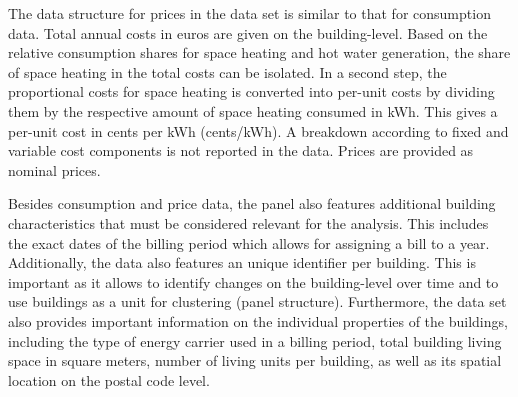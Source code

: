 \documentclass[12pt,twoside]{reedthesis}
\begin{document}
The data structure for prices in the data set is similar to that for consumption data. Total annual costs in euros are given on the building-level. Based on the relative consumption shares for space heating and hot water generation, the share of space heating in the total costs can be isolated. In a second step, the proportional costs for space heating is converted into per-unit costs by dividing them by the respective amount of space heating consumed in kWh. This gives a per-unit cost in cents per kWh (cents/kWh). A breakdown according to fixed and variable cost components is not reported in the data. Prices are provided as nominal prices.

Besides consumption and price data, the panel also features additional building characteristics that must be considered relevant for the analysis. This includes the exact dates of the billing period which allows for assigning a bill to a year. Additionally, the data also features an unique identifier per building. This is important as it allows to identify changes on the building-level over time and to use buildings as a unit for clustering (panel structure). Furthermore, the data set also provides important information on the individual properties of the buildings, including the type of energy carrier used in a billing period, total building living space in square meters, number of living units per building, as well as its spatial location on the postal code level.
\end{document}
